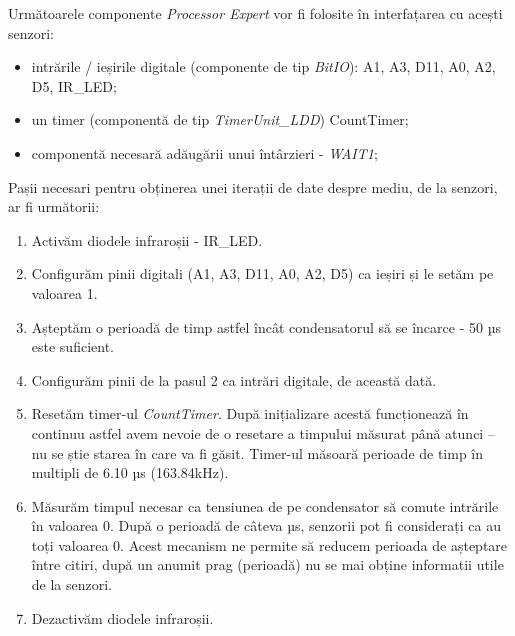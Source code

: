 Următoarele componente \textit{Processor Expert} vor fi folosite în interfațarea cu acești senzori:

\begin{itemize}
    \item intrările / ieșirile digitale (componente de tip \textit{BitIO}): A1, A3, D11, A0, A2, D5, IR\_LED;
    \item un timer (componentă de tip \textit{TimerUnit\_LDD}) CountTimer;
    \item componentă necesară adăugării unui întârzieri - \textit{WAIT1};
\end{itemize}

Pașii necesari pentru obținerea unei iterații de date despre mediu, de la senzori, ar fi următorii:

\begin{enumerate}
    \item Activăm diodele infraroșii - IR\_LED.
    \item Configurăm pinii digitali (A1, A3, D11, A0, A2, D5) ca ieșiri și le setăm pe valoarea 1.
    \item Așteptăm o perioadă de timp astfel încât condensatorul să se încarce - 50 µs este suficient.
    \item Configurăm pinii de la pasul 2 ca intrări digitale, de această dată.
    \item Resetăm timer-ul \textit{CountTimer}. După inițializare acestă funcționează în continuu astfel avem nevoie de o resetare a timpului măsurat până atunci – nu se știe starea în care va fi găsit. Timer-ul măsoară perioade de timp în multipli de 6.10 µs (163.84kHz).
    \item Măsurăm timpul necesar ca tensiunea de pe condensator să comute intrările în valoarea 0. După o perioadă de câteva µs, senzorii pot fi considerați ca au toți valoarea 0. Acest mecanism ne permite să reducem perioada de așteptare între citiri, după un anumit prag (perioadă) nu se mai obține informatii utile de la senzori.
    \item Dezactivăm diodele infraroșii.
\end{enumerate}
